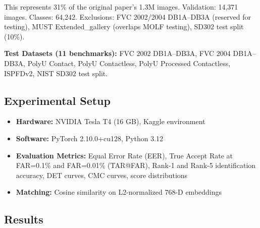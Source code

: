 \documentclass[conference]{IEEEtran}
\begin{document}
This represents 31\% of the original paper's 1.3M images. Validation: 14,371 images. Classes: 64,242. Exclusions: FVC 2002/2004 DB1A--DB3A (reserved for testing), MUST Extended\_gallery (overlaps MOLF testing), SD302 test split (10\%).

\textbf{Test Datasets (11 benchmarks):} FVC 2002 DB1A--DB3A, FVC 2004 DB1A--DB3A, PolyU Contact, PolyU Contactless, PolyU Processed Contactless, ISPFDv2, NIST SD302 test split.

\subsection{Experimental Setup}

\begin{itemize}
    \item \textbf{Hardware:} NVIDIA Tesla T4 (16 GB), Kaggle environment
    \item \textbf{Software:} PyTorch 2.10.0+cu128, Python 3.12
    \item \textbf{Evaluation Metrics:} Equal Error Rate (EER), True Accept Rate at FAR=0.1\% and FAR=0.01\% (TAR@FAR), Rank-1 and Rank-5 identification accuracy, DET curves, CMC curves, score distributions
    \item \textbf{Matching:} Cosine similarity on L2-normalized 768-D embeddings
\end{itemize}

\subsection{Results}
\end{document}
